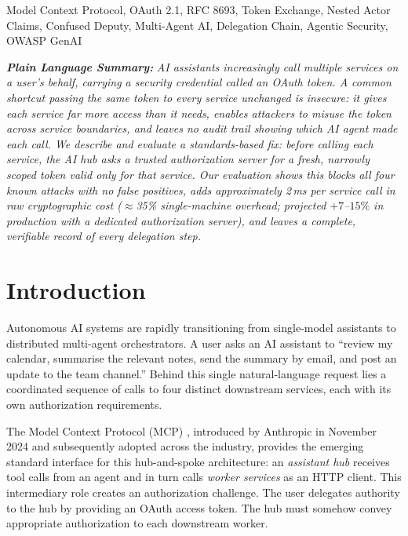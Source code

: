 \documentclass[journal]{IEEEtran}
\begin{document}
\begin{IEEEkeywords}
Model Context Protocol, OAuth 2.1, RFC 8693, Token Exchange, Nested Actor Claims,
Confused Deputy, Multi-Agent AI, Delegation Chain, Agentic Security, OWASP GenAI
\end{IEEEkeywords}

\vspace{4pt}
\noindent\textit{\textbf{Plain Language Summary:}}
\textit{AI assistants increasingly call multiple services on a user's behalf,
carrying a security credential called an OAuth token. A common
shortcut passing the same token to every service unchanged is insecure: it
gives each service far more access than it needs, enables attackers to misuse the
token across service boundaries, and leaves no audit trail showing which AI agent
made each call. We describe and evaluate a standards-based fix: before calling
each service, the AI hub asks a trusted authorization server for a fresh,
narrowly scoped token valid only for that service. Our evaluation shows this
blocks all four known attacks with no false positives, adds approximately 2\,ms
per service call in raw cryptographic cost ($\approx$35\% single-machine overhead;
projected $+7$--$15\%$ in production with a dedicated authorization server),
and leaves a complete, verifiable record of every delegation step.}

\section{Introduction}
\label{sec:introduction}

Autonomous AI systems are rapidly transitioning from single-model assistants to
distributed multi-agent orchestrators. A user asks an AI assistant to
``review my calendar, summarise the relevant notes, send the summary by email, and
post an update to the team channel.'' Behind this single natural-language request
lies a coordinated sequence of calls to four distinct downstream services, each
with its own authorization requirements.

The Model Context Protocol (MCP) \cite{mcp_spec,mcp_wiki}, introduced by Anthropic in
November 2024 and subsequently adopted across the industry, provides the emerging
standard interface for this hub-and-spoke architecture: an \textit{assistant hub}
receives tool calls from an agent and in turn calls \textit{worker services} as
an HTTP client. This intermediary role creates an authorization challenge. The
user delegates authority to the hub by providing an OAuth access token. The hub
must somehow convey appropriate authorization to each downstream worker.
\end{document}
